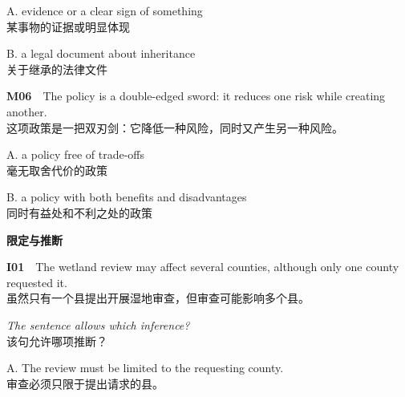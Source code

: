\documentclass[a4paper,11pt,openany]{report}
\newcommand{\zhline}[1]{{\CJKsf\color{bodygrey}#1}}
\begin{document}
\begin{samepage}
A. evidence or a clear sign of something\\
\zhline{某事物的证据或明显体现}
\par\end{samepage}

\begin{samepage}
B. a legal document about inheritance\\
\zhline{关于继承的法律文件}
\par\end{samepage}

\begin{samepage}
\textbf{M06}　The policy is a double-edged sword: it reduces one risk while creating another.\\
\zhline{这项政策是一把双刃剑：它降低一种风险，同时又产生另一种风险。}
\par\end{samepage}

\begin{samepage}
A. a policy free of trade-offs\\
\zhline{毫无取舍代价的政策}
\par\end{samepage}

\begin{samepage}
B. a policy with both benefits and disadvantages\\
\zhline{同时有益处和不利之处的政策}
\par\end{samepage}

\textbf{限定与推断}

\begin{samepage}
\textbf{I01}　The wetland review may affect several counties, although only one county requested it.\\
\zhline{虽然只有一个县提出开展湿地审查，但审查可能影响多个县。}
\par\end{samepage}

\begin{samepage}
\emph{The sentence allows which inference?}\\
\zhline{该句允许哪项推断？}
\par\end{samepage}

\begin{samepage}
A. The review must be limited to the requesting county.\\
\zhline{审查必须只限于提出请求的县。}
\par\end{samepage}
\end{document}
